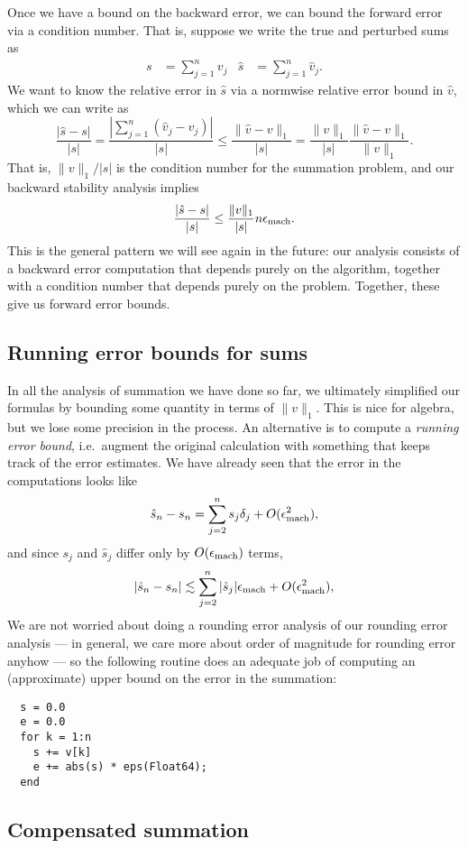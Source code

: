 \documentclass[12pt, leqno]{article} %
\begin{document}
Once we have a bound on the backward error, we can bound the forward
error via a condition number.  That is, suppose we write the true
and perturbed sums as
\begin{align*}
  s &= \sum_{j=1}^n v_j &
  \hat{s} &= \sum_{j=1}^n \hat{v}_j.
\end{align*}
We want to know the relative error in $\hat{s}$ via a normwise
relative error bound in $\hat{v}$, which we can write as
\[
  \frac{|\hat{s}-s|}{|s|} =
  \frac{|\sum_{j=1}^n (\hat{v}_j-v_j)|}{|s|} \leq
  \frac{\|\hat{v}-v\|_1}{|s|} =
  \frac{\|v\|_1}{|s|} \frac{\|\hat{v}-v\|_1}{\|v\|_1}.
\]
That is, $\|v\|_1/|s|$ is the condition number for the summation
problem, and our backward stability analysis implies
\[
  \frac{|\hat{s}-s|}{|s|} \leq
  \frac{\|v\|_1}{|s|} n \epsilon_{\mathrm{mach}}.
\]
This is the general pattern we will see again in the future:
our analysis consists of a backward error computation that depends
purely on the algorithm, together with a condition number that depends
purely on the problem.  Together, these give us forward error bounds.

\subsection{Running error bounds for sums}

In all the analysis of summation we have done so far, we ultimately
simplified our formulas by bounding some quantity in terms of $\|v\|_1$.
This is nice for algebra, but we lose some precision in the process.
An alternative is to compute a {\em running error bound}, i.e.~augment
the original calculation with something that keeps track of the error
estimates.  We have already seen that the error in the computations
looks like
\[
  \hat{s}_n-s_n = \sum_{j=2}^n s_j \delta_j + O(\epsilon_{\mathrm{mach}}^2),
\]
and since $s_j$ and $\hat{s}_j$ differ only by $O(\epsilon_{\mathrm{mach}})$ terms,
\[
  |\hat{s}_n-s_n| \lesssim \sum_{j=2}^n |\hat{s}_j| \epsilon_{\mathrm{mach}} + O(\epsilon_{\mathrm{mach}}^2),
\]
We are not worried about doing a rounding error analysis of our rounding
error analysis --- in general, we care more about order of magnitude for
rounding error anyhow --- so the following routine does an adequate job
of computing an (approximate) upper bound on the error in the summation:
\begin{lstlisting}
  s = 0.0
  e = 0.0
  for k = 1:n
    s += v[k]
    e += abs(s) * eps(Float64);
  end
\end{lstlisting}

\subsection{Compensated summation}
\end{document}
